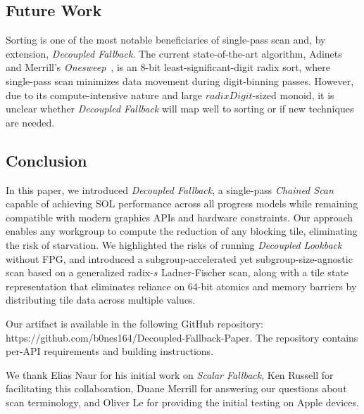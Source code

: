 \documentclass[sigconf,screen]{acmart}
\begin{document}
\subsection{Future Work}
Sorting is one of the most notable beneficiaries of single-pass scan and, by extension, \emph{Decoupled Fallback}. The current state-of-the-art algorithm, Adinets and Merrill's \emph{Onesweep}~\cite{adinets2022onesweepfastersignificantdigit}, is an 8-bit least-significant-digit radix sort, where single-pass scan minimizes data movement during digit-binning passes. However, due to its compute-intensive nature and large $\textit{radixDigit}$-sized monoid, it is unclear whether \emph{Decoupled Fallback} will map well to sorting or if new techniques are needed.

\subsection{Conclusion}
In this paper, we introduced \emph{Decoupled Fallback}, a single-pass \emph{Chained Scan} capable of achieving SOL performance across all progress models while remaining compatible with modern graphics APIs and hardware constraints. Our approach enables any workgroup to compute the reduction of any blocking tile, eliminating the risk of starvation. We highlighted the risks of running \emph{Decoupled Lookback} without FPG, and introduced a subgroup-accelerated yet subgroup-size-agnostic scan based on a generalized radix-$s$ Ladner-Fischer scan, along with a tile state representation that eliminates reliance on 64-bit atomics and memory barriers by distributing tile data across multiple values.

Our artifact is available in the following GitHub repository: https://github.com/b0nes164/Decoupled-Fallback-Paper. The repository contains per-API requirements and building instructions.

\begin{acks}
We thank Elias Naur for his initial work on \emph{Scalar Fallback}, Ken Russell for facilitating this collaboration, Duane Merrill for answering our questions about scan terminology, and Oliver Le for providing the initial testing on Apple devices.
\end{acks}



\end{document}
